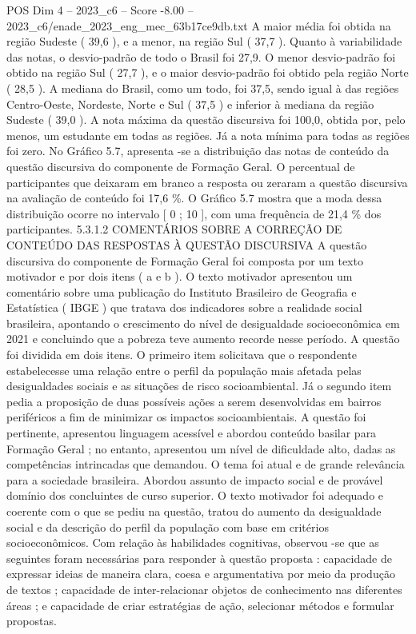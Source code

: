 \begin{textsample}{POS Dim 4 – 2023\_c6 – Score -8.00 – 2023\_c6/enade\_2023\_eng\_mec\_63b17ce9db.txt}
A maior média foi obtida na região Sudeste ( 39,6 ), e a menor, na região Sul ( 37,7 ).
Quanto à variabilidade das notas, o desvio-padrão de todo o Brasil foi 27,9.
O menor desvio-padrão foi obtido na região Sul ( 27,7 ), e o maior desvio-padrão foi obtido pela região Norte ( 28,5 ).
A mediana do Brasil, como um todo, foi 37,5, sendo igual à das regiões Centro-Oeste, Nordeste, Norte e Sul ( 37,5 ) e inferior à mediana da região Sudeste ( 39,0 ).
A nota máxima da questão discursiva foi 100,0, obtida por, pelo menos, um estudante em todas as regiões.
Já a nota mínima para todas as regiões foi zero.
No Gráfico 5.7, apresenta -se a distribuição das notas de conteúdo da questão discursiva do componente de Formação Geral.
O percentual de participantes que deixaram em branco a resposta ou zeraram a questão discursiva na avaliação de conteúdo foi 17,6 \%.
O Gráfico 5.7 mostra que a moda dessa distribuição ocorre no intervalo [ 0 ; 10 ], com uma frequência de 21,4 \% dos participantes. 5.3.1.2 COMENTÁRIOS SOBRE A CORREÇÃO DE CONTEÚDO DAS RESPOSTAS À QUESTÃO DISCURSIVA A questão discursiva do componente de Formação Geral foi composta por um texto motivador e por dois itens ( a e b ).
O texto motivador apresentou um comentário sobre uma publicação do Instituto Brasileiro de Geografia e Estatística ( IBGE ) que tratava dos indicadores sobre a realidade social brasileira, apontando o crescimento do nível de desigualdade socioeconômica em 2021 e concluindo que a pobreza teve aumento recorde nesse período.
A questão foi dividida em dois itens.
O primeiro item solicitava que o respondente estabelecesse uma relação entre o perfil da população mais afetada pelas desigualdades sociais e as situações de risco socioambiental.
Já o segundo item pedia a proposição de duas possíveis ações a serem desenvolvidas em bairros periféricos a fim de minimizar os impactos socioambientais.
A questão foi pertinente, apresentou linguagem acessível e abordou conteúdo basilar para Formação Geral ; no entanto, apresentou um nível de dificuldade alto, dadas as competências intrincadas que demandou.
O tema foi atual e de grande relevância para a sociedade brasileira.
Abordou assunto de impacto social e de provável domínio dos concluintes de curso superior.
O texto motivador foi adequado e coerente com o que se pediu na questão, tratou do aumento da desigualdade social e da descrição do perfil da população com base em critérios socioeconômicos.
Com relação às habilidades cognitivas, observou -se que as seguintes foram necessárias para responder à questão proposta : capacidade de expressar ideias de maneira clara, coesa e argumentativa por meio da produção de textos ; capacidade de inter-relacionar objetos de conhecimento nas diferentes áreas ; e capacidade de criar estratégias de ação, selecionar métodos e formular propostas.

\end{textsample}
